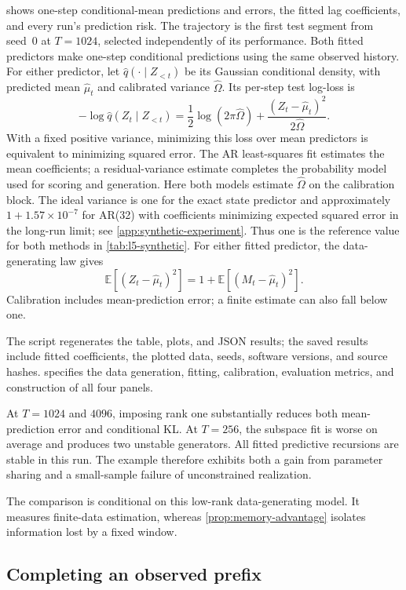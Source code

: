 \documentclass[11pt,twoside]{article}
\newcommand{\E}{\mathbb E}
\theoremstyle{definition}
\theoremstyle{remark}
\begin{document}
 shows one-step conditional-mean predictions and errors,
the fitted lag coefficients, and every run's prediction risk.
The trajectory is the first test segment from seed~0 at \(T=1024\),
selected independently of its performance. Both fitted predictors make
one-step conditional predictions using the same observed history.
For either predictor, let \(\widehat q(\cdot\mid Z_{<t})\) be its Gaussian
conditional density, with predicted mean \(\widehat\mu_t\) and calibrated
variance \(\widehat\Omega\). Its per-step test log-loss is
\[
 -\log\widehat q(Z_t\mid Z_{<t})
 =\frac12\log(2\pi\widehat\Omega)
  +\frac{(Z_t-\widehat\mu_t)^2}{2\widehat\Omega}.
\]
With a fixed positive variance, minimizing this loss over mean predictors
is equivalent to
minimizing squared error. The AR least-squares fit estimates the mean
coefficients; a residual-variance estimate completes the probability
model used for scoring and generation. Here both models estimate
\(\widehat\Omega\) on the calibration block. The ideal variance is
one for the exact state predictor and approximately
\(1+1.57\times10^{-7}\) for AR(32) with coefficients minimizing expected
squared error in the long-run limit; see \cref{app:synthetic-experiment}.
Thus one is the reference value for both methods in \cref{tab:l5-synthetic}.
For either fitted predictor, the data-generating law gives
\[
 \E[(Z_t-\widehat\mu_t)^2]
 =1+\E[(M_t-\widehat\mu_t)^2].
\]
Calibration includes mean-prediction error; a finite estimate can also
fall below one.

The script regenerates the table,
plots, and JSON results; the saved results include fitted coefficients,
the plotted data, seeds, software versions, and source hashes.
 specifies the data generation, fitting,
calibration, evaluation metrics, and construction of all four panels.

At \(T=1024\) and \(4096\), imposing rank one substantially reduces
both mean-prediction error and conditional KL. At \(T=256\), the
subspace fit is worse on average and produces two unstable generators.
All fitted predictive recursions are stable in this run. The example
therefore exhibits both a gain from parameter sharing and a small-sample
failure of unconstrained realization.

The comparison is conditional on this low-rank data-generating model.
It measures finite-data estimation, whereas
\cref{prop:memory-advantage} isolates information lost by a fixed window.

\subsection{Completing an observed prefix}
\label{sec:completion-experiments}
\end{document}
